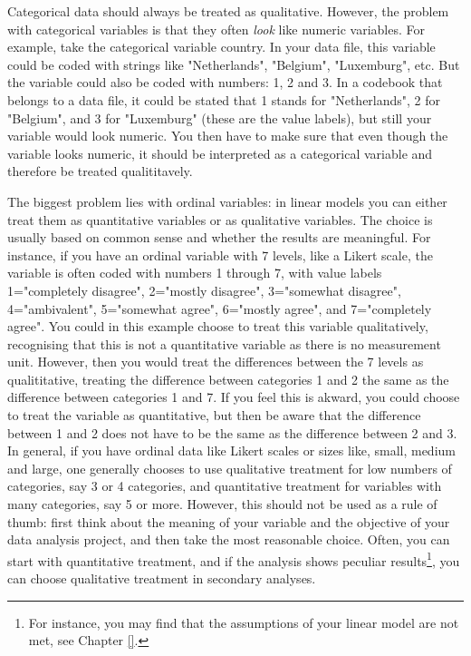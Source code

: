 \documentclass[]{report}\usepackage[]{graphicx}\usepackage[]{color}
\begin{document}
Categorical data should always be treated as qualitative. However, the problem with  categorical variables is that they often \textit{look} like numeric variables. For example, take the categorical variable country. In your data file, this variable could be coded with strings like "Netherlands", "Belgium", "Luxemburg", etc. But the variable could also be coded with numbers: 1, 2 and 3. In a codebook that belongs to a data file, it could be stated that 1 stands for "Netherlands", 2 for "Belgium", and 3 for "Luxemburg" (these are the value labels), but still your variable would look numeric. You then have to make sure that even though the variable looks numeric, it should be interpreted as a categorical variable and therefore be treated qualititavely. 

The biggest problem lies with ordinal variables: in linear models you can either treat them as quantitative variables or as qualitative variables. The choice is usually based on common sense and whether the results are meaningful. For instance, if you have an ordinal variable with 7 levels, like a Likert scale, the variable is often coded with numbers 1 through 7, with value labels 1="completely disagree", 2="mostly disagree", 3="somewhat disagree", 4="ambivalent", 5="somewhat agree", 6="mostly agree", and 7="completely agree". You could in this example choose to treat this variable qualitatively, recognising that this is not a quantitative variable as there is no measurement unit. However, then you would treat the differences between the 7 levels as qualititative, treating the difference between categories 1 and 2 the same as the difference between categories 1 and 7. If you feel this is akward, you could choose to treat the variable as quantitative, but then be aware that the difference between 1 and 2 does not have to be the same as the difference between 2 and 3. In general, if you have ordinal data like Likert scales or sizes like, small, medium and large, one generally chooses to use qualitative treatment for low numbers of categories, say 3 or 4 categories, and quantitative treatment for variables with many categories, say 5 or more. However, this should not be used as a rule of thumb: first think about the meaning of your variable and the objective of your data analysis project, and then take the most reasonable choice. Often, you can start with quantitative treatment, and if the analysis shows peculiar results\footnote{For instance, you may find that the assumptions of your linear model are not met, see Chapter \ref{}.}, you can choose qualitative treatment in secondary analyses.
\end{document}

